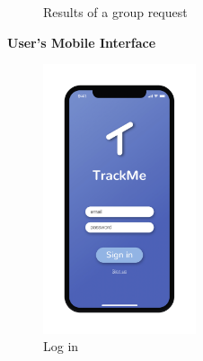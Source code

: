 \begin{figure}[H]
    \centering
    \caption{Results of a group request }
\end{figure}



\newpage


\begin{center}
	\textbf{User's Mobile Interface}
\end{center}

\begin{figure}[H]
    \centering
    \includegraphics[width=0.4\textwidth]{./Pictures/Mockup/mobile/login.png}
    \captionsetup{skip=0pt}
    \caption{Log in}
\end{figure}



